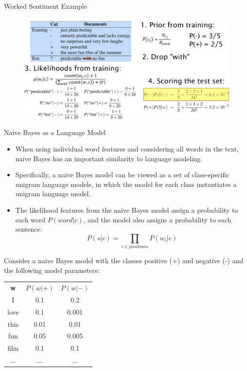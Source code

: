 \documentclass[handout]{beamer}
\begin{document}
\begin{frame}{Worked Sentiment Example}

\begin{figure}[h]
\includegraphics[scale = 0.23]{pics/naive_example.png}
\end{figure}

\end{frame}


\begin{frame}{Naive Bayes as a Language Model}
\scriptsize
\begin{itemize}
 \item When using individual word features and considering all words in the text, naive Bayes has an important similarity to language modeling. 
 \item Specifically, a naive Bayes model can be viewed as a set of class-specific unigram language models, in which the model for each class instantiates a unigram language model.
 \item The likelihood features from the naive Bayes model assign a probability to each word $P(word|c)$, and the model also assigns a probability to each sentence:
\[P(s|c) = \prod_{i\in positions} P(w_i|c)\]
\end{itemize}
Consider a naive Bayes model with the classes positive (+) and negative (-) and the following model parameters:
\begin{center}
\begin{tabular}{ccc}
\textbf{w} & $P(w|+)$ & $P(w|-)$ \\
I & 0.1 & 0.2 \\
love & 0.1 & 0.001 \\
this & 0.01 & 0.01 \\
fun & 0.05 & 0.005 \\
film & 0.1 & 0.1 \\
... & ... & ...
\end{tabular}
\end{center}


\end{frame}
\end{document}

